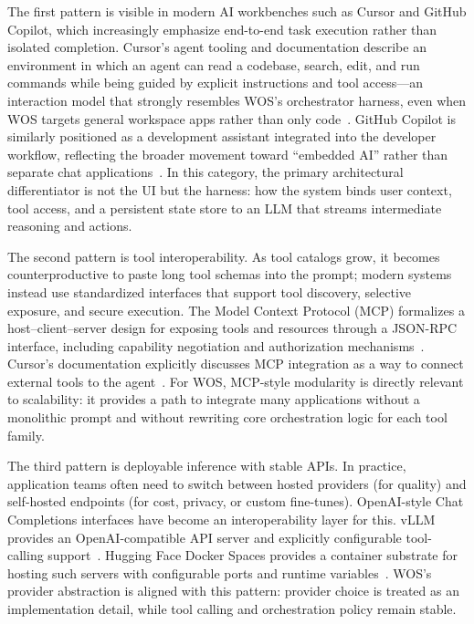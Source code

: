 \documentclass[conference]{IEEEtran}
\begin{document}
The first pattern is visible in modern AI workbenches such as Cursor and GitHub Copilot, which increasingly emphasize end-to-end task execution rather than isolated completion. Cursor’s agent tooling and documentation describe an environment in which an agent can read a codebase, search, edit, and run commands while being guided by explicit instructions and tool access—an interaction model that strongly resembles WOS’s orchestrator harness, even when WOS targets general workspace apps rather than only code~\cite{cursor_tools}. GitHub Copilot is similarly positioned as a development assistant integrated into the developer workflow, reflecting the broader movement toward “embedded AI” rather than separate chat applications~\cite{copilot_feature}. In this category, the primary architectural differentiator is not the UI but the harness: how the system binds user context, tool access, and a persistent state store to an LLM that streams intermediate reasoning and actions.

The second pattern is tool interoperability. As tool catalogs grow, it becomes counterproductive to paste long tool schemas into the prompt; modern systems instead use standardized interfaces that support tool discovery, selective exposure, and secure execution. The Model Context Protocol (MCP) formalizes a host–client–server design for exposing tools and resources through a JSON-RPC interface, including capability negotiation and authorization mechanisms~\cite{mcp_spec}. Cursor’s documentation explicitly discusses MCP integration as a way to connect external tools to the agent~\cite{cursor_mcp}. For WOS, MCP-style modularity is directly relevant to scalability: it provides a path to integrate many applications without a monolithic prompt and without rewriting core orchestration logic for each tool family.

The third pattern is deployable inference with stable APIs. In practice, application teams often need to switch between hosted providers (for quality) and self-hosted endpoints (for cost, privacy, or custom fine-tunes). OpenAI-style Chat Completions interfaces have become an interoperability layer for this. vLLM provides an OpenAI-compatible API server and explicitly configurable tool-calling support~\cite{vllm_openai_server,vllm_tool_calling}. Hugging Face Docker Spaces provides a container substrate for hosting such servers with configurable ports and runtime variables~\cite{hf_docker_spaces}. WOS’s provider abstraction is aligned with this pattern: provider choice is treated as an implementation detail, while tool calling and orchestration policy remain stable.
\end{document}

